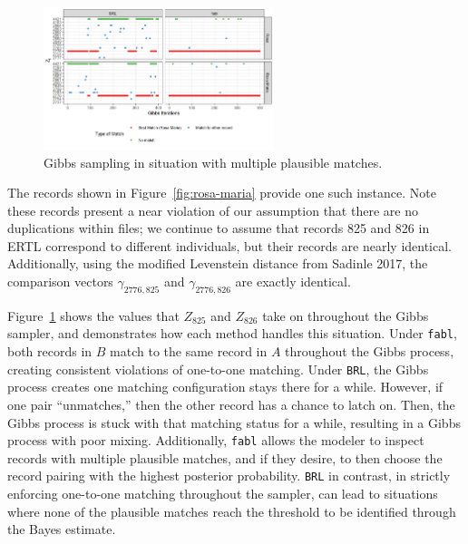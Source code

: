 \documentclass[12pt,letterpaper]{article}
\newcommand{\1}[1]{\mathbb{I}\!\left[#1\right]} %
\begin{document}
\begin{figure}[t]
	
	{\centering \includegraphics[width=0.6\textwidth]{../notes/figures/el_salvador/bad_mixing} 
		
	}
	
	\caption{Gibbs sampling in situation with multiple plausible matches.}\label{fig:mixing-plot}
\end{figure}

The records shown in Figure~\ref{fig:rosa-maria} provide one such instance. Note these
records present a near violation of our assumption that there are no
duplications within files; we continue to assume that records 825 and
826 in ERTL correspond to different individuals, but their records are
nearly identical. Additionally, using the modified Levenstein distance
from Sadinle 2017, the comparison vectors \(\gamma_{2776, 825}\) and
\(\gamma_{2776, 826}\) are exactly identical.

Figure~\ref{fig:mixing-plot} shows the values that \(Z_{825}\) and \(Z_{826}\) take on
throughout the Gibbs sampler, and demonstrates how each method handles
this situation. Under \texttt{fabl}, both records in \(B\) match to the
same record in \(A\) throughout the Gibbs process, creating consistent
violations of one-to-one matching. Under \texttt{BRL}, the Gibbs process
creates one matching configuration stays there for a while. However, if
one pair ``unmatches,'' then the other record has a chance to latch on.
Then, the Gibbs process is stuck with that matching status for a while,
resulting in a Gibbs process with poor mixing. Additionally,
\texttt{fabl} allows the modeler to inspect records with multiple
plausible matches, and if they desire, to then choose the record pairing
with the highest posterior probability. \texttt{BRL} in contrast, in
strictly enforcing one-to-one matching throughout the sampler, can lead
to situations where none of the plausible matches reach the threshold to
be identified through the Bayes estimate.
\end{document}

